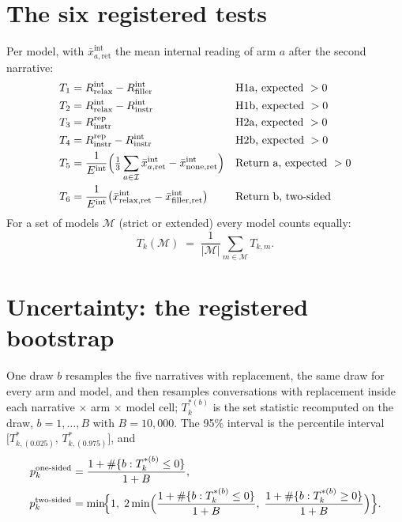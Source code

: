 \documentclass[11pt]{article}
\newcommand{\ret}{\mathrm{ret}}
\newcommand{\rlx}{\mathrm{relax}}
\newcommand{\flr}{\mathrm{filler}}
\newcommand{\instr}{\mathrm{instr}}
\newcommand{\none}{\mathrm{none}}
\newcommand{\rep}{\mathrm{rep}}
\newcommand{\intl}{\mathrm{int}}
\begin{document}
\section{The six registered tests}

Per model, with $\bar{x}^{\intl}_{a,\ret}$ the mean internal reading of arm $a$ after the second
narrative:
\begin{align}
  T_1 &= R^{\intl}_{\rlx} - R^{\intl}_{\flr}      && \text{H1a, expected } > 0 \\
  T_2 &= R^{\intl}_{\rlx} - R^{\intl}_{\instr}     && \text{H1b, expected } > 0 \\
  T_3 &= R^{\rep}_{\instr}                           && \text{H2a, expected } > 0 \\
  T_4 &= R^{\rep}_{\instr} - R^{\intl}_{\instr}      && \text{H2b, expected } > 0 \\
  T_5 &= \frac{1}{E^{\intl}} \Bigl( \tfrac13 \sum_{a \in \mathcal{I}} \bar{x}^{\intl}_{a,\ret}
         - \bar{x}^{\intl}_{\none,\ret} \Bigr)       && \text{Return a, expected } > 0 \\
  T_6 &= \frac{1}{E^{\intl}} \bigl( \bar{x}^{\intl}_{\rlx,\ret} - \bar{x}^{\intl}_{\flr,\ret} \bigr)
                                                     && \text{Return b, two-sided}
\end{align}
For a set of models $\mathcal{M}$ (strict or extended) every model counts equally:
\begin{equation}
  T_k(\mathcal{M}) \;=\; \frac{1}{|\mathcal{M}|} \sum_{m \in \mathcal{M}} T_{k,m} .
\end{equation}

\section{Uncertainty: the registered bootstrap}

One draw $b$ resamples the five narratives with replacement, the same draw for every arm and model,
and then resamples conversations with replacement inside each narrative $\times$ arm $\times$ model
cell; $T_k^{*(b)}$ is the set statistic recomputed on the draw, $b = 1,\dots,B$ with $B = 10{,}000$.
The 95\% interval is the percentile interval $\bigl[T^{*}_{k,(0.025)},\, T^{*}_{k,(0.975)}\bigr]$, and
\begin{align}
  p_k^{\text{one-sided}} &= \frac{1 + \#\{b : T_k^{*(b)} \le 0\}}{1 + B}, \\
  p_k^{\text{two-sided}} &= \min\!\Bigl\{1,\; 2 \min\Bigl(
      \frac{1 + \#\{b : T_k^{*(b)} \le 0\}}{1 + B},\;
      \frac{1 + \#\{b : T_k^{*(b)} \ge 0\}}{1 + B} \Bigr)\Bigr\}.
\end{align}
\end{document}
